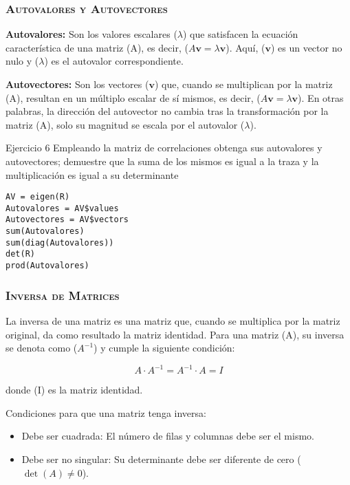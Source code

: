 \documentclass[16.5pt]{beamer}
\begin{document}
{
\begin{frame}
\frametitle{\textsc{\textbf{Autovalores y Autovectores}}}
\hspace*{-5mm}
\vspace*{-1mm} 
\vspace{0.3cm}

\textbf{Autovalores:} Son los valores escalares ($\lambda$) que satisfacen la ecuación característica de una matriz (A), es decir, ($A\mathbf{v} = \lambda\mathbf{v}$). Aquí, ($\mathbf{v}$) es un vector no nulo y ($\lambda$) es el autovalor correspondiente.

\textbf{Autovectores:} Son los vectores ($\mathbf{v}$) que, cuando se multiplican por la matriz (A), resultan en un múltiplo escalar de sí mismos, es decir, ($A\mathbf{v} = \lambda\mathbf{v}$). En otras palabras, la dirección del autovector no cambia tras la transformación por la matriz (A), solo su magnitud se escala por el autovalor ($\lambda$).

\begin{bclogo}{Ejercicio 6}
 {\tiny\color{blue} Empleando la matriz de correlaciones obtenga sus autovalores y autovectores; demuestre que la suma de los mismos es igual a la traza y la multiplicación es igual a su determinante}
\begin{lstlisting}[basicstyle=\tiny]
AV = eigen(R)
Autovalores = AV$values
Autovectores = AV$vectors
sum(Autovalores)
sum(diag(Autovalores))
det(R)
prod(Autovalores)
\end{lstlisting}
\end{bclogo}
\end{frame}
}



{
\begin{frame}
\frametitle{\textsc{\textbf{Inversa de Matrices}}}
\hspace*{-5mm}
\vspace*{-5mm} 
\vspace{0.3cm}

La inversa de una matriz es una matriz que, cuando se multiplica por la matriz original, da como resultado la matriz identidad. Para una matriz (A), su inversa se denota como ($A^{-1}$) y cumple la siguiente condición:

\[ A \cdot A^{-1} = A^{-1} \cdot A = I \]

donde (I) es la matriz identidad.

Condiciones para que una matriz tenga inversa:
\begin{itemize}
\item Debe ser cuadrada: El número de filas y columnas debe ser el mismo.
\item Debe ser no singular: Su determinante debe ser diferente de cero ($\det(A) \neq 0$).
\end{itemize}




\end{frame}
}
\end{document}
